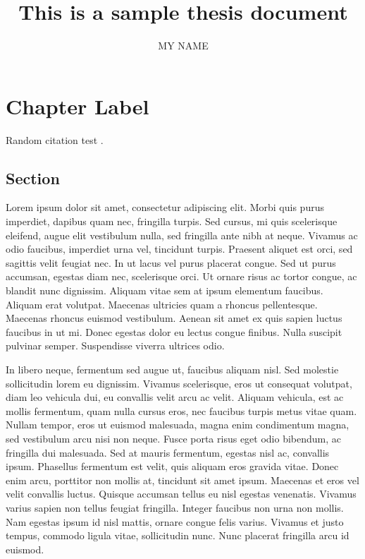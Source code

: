\documentclass[draft]{yorkUThesisTemplate}
\title{This is a sample thesis document}
\author{MY NAME}
\begin{document}
\makefrontmatter
\formatmainmatter

\chapter{Chapter Label}

Random citation test \cite{einstein}.

\section{Section}

Lorem ipsum dolor sit amet, consectetur adipiscing elit. Morbi quis purus imperdiet, dapibus quam nec, fringilla turpis. Sed cursus, mi quis scelerisque eleifend, augue elit vestibulum nulla, sed fringilla ante nibh at neque. Vivamus ac odio faucibus, imperdiet urna vel, tincidunt turpis. Praesent aliquet est orci, sed sagittis velit feugiat nec. In ut lacus vel purus placerat congue. Sed ut purus accumsan, egestas diam nec, scelerisque orci. Ut ornare risus ac tortor congue, ac blandit nunc dignissim. Aliquam vitae sem at ipsum elementum faucibus. Aliquam erat volutpat. Maecenas ultricies quam a rhoncus pellentesque. Maecenas rhoncus euismod vestibulum. Aenean sit amet ex quis sapien luctus faucibus in ut mi. Donec egestas dolor eu lectus congue finibus. Nulla suscipit pulvinar semper. Suspendisse viverra ultrices odio.

In libero neque, fermentum sed augue ut, faucibus aliquam nisl. Sed molestie sollicitudin lorem eu dignissim. Vivamus scelerisque, eros ut consequat volutpat, diam leo vehicula dui, eu convallis velit arcu ac velit. Aliquam vehicula, est ac mollis fermentum, quam nulla cursus eros, nec faucibus turpis metus vitae quam. Nullam tempor, eros ut euismod malesuada, magna enim condimentum magna, sed vestibulum arcu nisi non neque. Fusce porta risus eget odio bibendum, ac fringilla dui malesuada. Sed at mauris fermentum, egestas nisl ac, convallis ipsum. Phasellus fermentum est velit, quis aliquam eros gravida vitae. Donec enim arcu, porttitor non mollis at, tincidunt sit amet ipsum. Maecenas et eros vel velit convallis luctus. Quisque accumsan tellus eu nisl egestas venenatis. Vivamus varius sapien non tellus feugiat fringilla. Integer faucibus non urna non mollis. Nam egestas ipsum id nisl mattis, ornare congue felis varius. Vivamus et justo tempus, commodo ligula vitae, sollicitudin nunc. Nunc placerat fringilla arcu id euismod.
\end{document}
